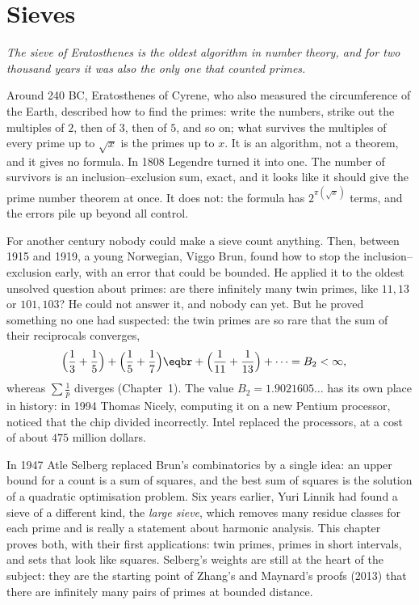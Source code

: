 \chapter{Sieves}

\begin{center}\itshape
The sieve of Eratosthenes is the oldest algorithm in number theory, and for two thousand years it was also the only one that counted primes.
\end{center}

Around 240 BC, Eratosthenes of Cyrene, who also measured the circumference of the Earth, described how to find the primes: write the numbers, strike out the
multiples of $2$, then of $3$, then of $5$, and so on; what survives the multiples of every prime up to $\sqrt x$ is the primes up to $x$. It is an algorithm, not a theorem,
and it gives no formula. In 1808 Legendre turned it into one. The number of survivors is an inclusion--exclusion sum, exact, and it looks like it should give the prime
number theorem at once. It does not: the formula has $2^{\pi(\sqrt x)}$ terms, and the errors pile up beyond all control.

For another century nobody could make a sieve count anything. Then, between 1915 and 1919, a young Norwegian, Viggo Brun, found how to stop the inclusion--exclusion
early, with an error that could be bounded. He applied it to the oldest unsolved question about primes: are there infinitely many twin primes, like $11,13$ or $101,103$? He
could not answer it, and nobody can yet. But he proved something no one had suspected: the twin primes are so rare that the sum of their reciprocals converges,
\[
\begin{aligned}\Bigl(\frac13+\frac15\Bigr)&+\Bigl(\frac15+\frac17\Bigr)\eqbr+\Bigl(\frac1{11}+\frac1{13}\Bigr)+\cdots=B_2<\infty,\end{aligned}
\]
whereas $\sum\frac1p$ diverges (Chapter~1). The value $B_2=1.9021605\ldots$ has its own place in history: in 1994 Thomas Nicely, computing it on a new Pentium processor,
noticed that the chip divided incorrectly. Intel replaced the processors, at a cost of about $475$ million dollars.

In 1947 Atle Selberg replaced Brun's combinatorics by a single idea: an upper bound for a count is a sum of squares, and the best sum of squares is the solution of a quadratic
optimisation problem. Six years earlier, Yuri Linnik had found a sieve of a different kind, the \emph{large sieve}, which removes many residue classes for each prime and is really
a statement about harmonic analysis. This chapter proves both, with their first applications: twin primes, primes in short intervals, and sets that look like squares.
Selberg's weights are still at the heart of the subject: they are the starting point of Zhang's and Maynard's proofs (2013) that there are infinitely many pairs of primes at
bounded distance.

